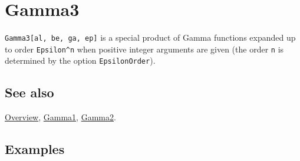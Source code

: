 \documentclass[../FeynCalcManual.tex]{subfiles}
\begin{document}
\hypertarget{gamma3}{
\section{Gamma3}\label{gamma3}}

\texttt{Gamma3[\allowbreak{}al,\ \allowbreak{}be,\ \allowbreak{}ga,\ \allowbreak{}ep]}
is a special product of Gamma functions expanded up to order
\texttt{Epsilon^n} when positive integer arguments are given (the order
\texttt{n} is determined by the option \texttt{EpsilonOrder}).

\subsection{See also}

\hyperlink{toc}{Overview}, \hyperlink{gamma1}{Gamma1},
\hyperlink{gamma2}{Gamma2}.

\subsection{Examples}
\end{document}
